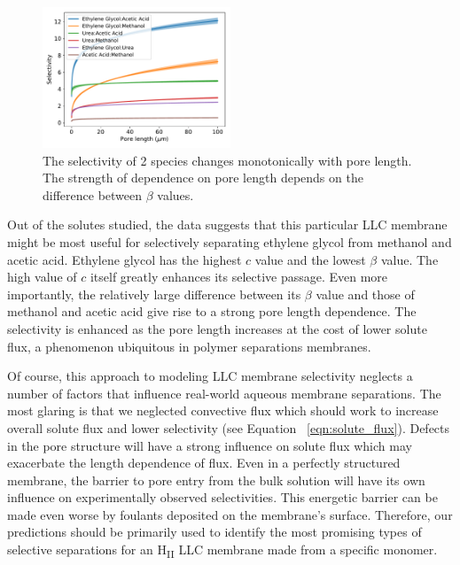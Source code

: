 \documentclass{article}
\begin{document}
  \begin{figure}
  \centering
  \includegraphics[width=0.5\textwidth]{selectivity.pdf}
  \caption{The selectivity of 2 species changes monotonically with pore length. The
  strength of dependence on pore length depends on the difference between $\beta$ values.}
  \label{fig:selectivity}
  \end{figure}
  
  Out of the solutes studied, the data suggests that this particular LLC membrane 
  might
  be most useful for selectively separating ethylene glycol from methanol and 
  acetic acid. 
  Ethylene glycol has the highest $c$ value and the lowest $\beta$ value. The high
  value of $c$ itself greatly enhances its selective passage. Even more importantly,
  the relatively large difference between its $\beta$ value and those of methanol 
  and acetic acid give rise to a strong pore length dependence. The selectivity is
  enhanced as the pore length increases at the cost of lower solute flux, a 
  phenomenon ubiquitous in polymer separations membranes.~\cite{geise_water_2011}

  Of course, this approach to modeling LLC membrane selectivity neglects a number of
  factors that influence real-world aqueous membrane separations. The most glaring is 
  that we neglected convective flux which should work to increase overall solute flux 
  and lower selectivity (see Equation ~\ref{eqn:solute_flux}). Defects in the pore 
  structure will have a strong influence on solute flux which may exacerbate the length 
  dependence of flux. Even in a perfectly structured membrane, the barrier to pore
  entry from the bulk solution will have its own influence on experimentally observed 
  selectivities. This energetic barrier can be made even worse by foulants deposited on
  the membrane's surface. Therefore, our predictions should be primarily used to 
  identify the most promising types of selective separations for an H\textsubscript{II}
  LLC membrane made from a specific monomer.
\end{document}
